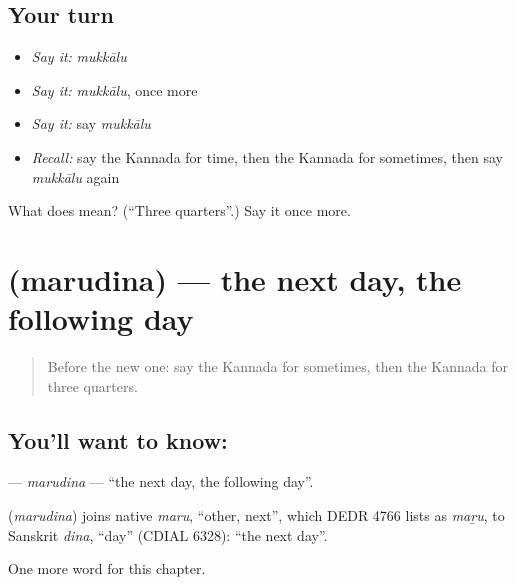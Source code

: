 \subsection*{Your turn}
\begin{itemize}
\raggedright
  \item \emph{Say it:} \emph{mukkālu}
  \item \emph{Say it:} \emph{mukkālu}, once more
  \item \emph{Say it:} say \emph{mukkālu}
  \item \emph{Recall:} say the Kannada for time, then the Kannada for sometimes, then say \emph{mukkālu} again
\end{itemize}

\begin{tcolorbox}[breakable,colback=teal!4,colframe=teal!35!black,title={Before you move on}]
What does  mean? (\textquotedblleft{}Three quarters\textquotedblright{}.) Say it once more.
\end{tcolorbox}
\section[\texorpdfstring{\kn{ಮರುದಿನ} (marudina)}{ಮರುದಿನ (marudina)}]{ (marudina) — the next day, the following day}

\label{lesson:KA-C285-marudina}



\begin{quote}
Before the new one: say the Kannada for sometimes, then the Kannada for three quarters.
\end{quote}

\subsection*{You'll want to know: }
\textbf{} — \emph{marudina} — \textquotedblleft{}the next day, the following day\textquotedblright{}.

\begin{cousinweb}
\textbf{} (\emph{marudina}) joins native \emph{maru}, \textquotedblleft{}other, next\textquotedblright{}, which DEDR 4766 lists as \emph{maṟu}, to Sanskrit \emph{dina}, \textquotedblleft{}day\textquotedblright{} (CDIAL 6328): \textquotedblleft{}the next day\textquotedblright{}.
\end{cousinweb}

\begin{grammarlens}[title={What you've built}]
One more word for this chapter.
\end{grammarlens}


